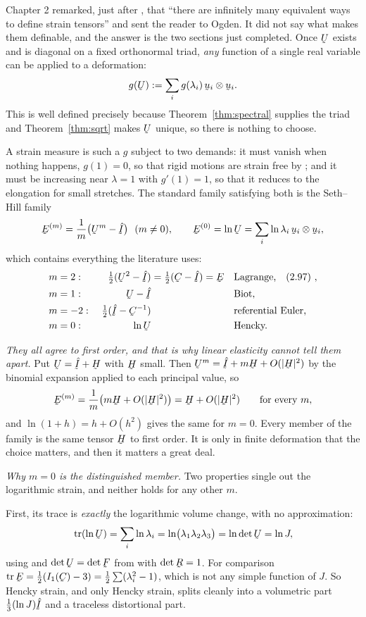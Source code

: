\begin{remark}
\label{rem:sethhill}
Chapter 2 remarked, just after , that ``there are infinitely many
equivalent ways to define strain tensors'' and sent the reader to Ogden.
It did not say what makes them definable, and the answer is the two
sections just completed. Once $\bU$ exists and is diagonal on a fixed
orthonormal triad, \emph{any} function of a single real variable can be
applied to a deformation:
\[
   g(\bU):=\sum_{i}g(\lambda_{i})\,\bu_{i}\otimes\bu_{i}.
\]
This is well defined precisely because Theorem~\ref{thm:spectral} supplies
the triad and Theorem~\ref{thm:sqrt} makes $\bU$ unique, so there is
nothing to choose.

A strain measure is such a $g$ subject to two demands: it must vanish when
nothing happens, $g(1)=0$, so that rigid motions are strain free by
; and it must be increasing near $\lambda=1$ with $g'(1)=1$, so
that it reduces to the elongation for small stretches. The standard family
satisfying both is the Seth--Hill family
\[
   \bE^{(m)}=\frac1m\big(\bU^{m}-\hI\big)\ \ (m\neq0),
   \qquad
   \bE^{(0)}=\ln\bU=\sum_{i}\ln\lambda_{i}\,\bu_{i}\otimes\bu_{i},
\]
which contains everything the literature uses:
\[
\begin{aligned}
   m&=2: &\ \tfrac12(\bU^{2}-\hI)&=\tfrac12(\bC-\hI)=\bE
     &&\text{Lagrange, }\eqr{2.97},\\
   m&=1: &\ \bU-\hI& &&\text{Biot,}\\
   m&=-2:&\ \tfrac12(\hI-\bC^{-1})& &&\text{referential Euler,}\\
   m&=0: &\ \ln\bU& &&\text{Hencky.}
\end{aligned}
\]

\emph{They all agree to first order, and that is why linear elasticity
cannot tell them apart.} Put $\bU=\hI+\bH$ with $\bH$ small. Then
$\bU^{m}=\hI+m\bH+O(|\bH|^{2})$ by the binomial expansion applied to each
principal value, so
\[
   \bE^{(m)}=\frac1m\big(m\bH+O(|\bH|^{2})\big)=\bH+O(|\bH|^{2})
   \qquad\text{for every }m,
\]
and $\ln(1+h)=h+O(h^{2})$ gives the same for $m=0$. Every member of the
family is the same tensor $\bH$ to first order. It is only in finite
deformation that the choice matters, and then it matters a great deal.

\emph{Why $m=0$ is the distinguished member.} Two properties single out the
logarithmic strain, and neither holds for any other $m$.

First, its trace is \emph{exactly} the logarithmic volume change, with no
approximation:
\[
   \tr(\ln\bU)=\sum_{i}\ln\lambda_{i}
     =\ln\!\big(\lambda_{1}\lambda_{2}\lambda_{3}\big)
     =\ln\det\bU=\ln J ,
\]
using  and $\det\bU=\det\bF$ from  with $\det\bR=1$. For
comparison $\tr\bE=\tfrac12(I_{1}(\bC)-3)=\tfrac12\sum(\lambda_{i}^{2}-1)$,
which is not any simple function of $J$. So Hencky strain, and only Hencky
strain, splits cleanly into a volumetric part $\tfrac13(\ln J)\hI$ and a
traceless distortional part.


\end{remark}
